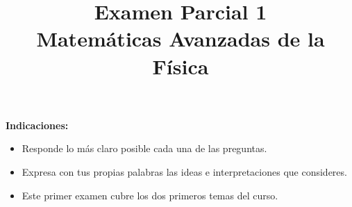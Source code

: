 
\usepackage{enumerate}
\usepackage{pifont}
\renewcommand{\labelitemi}{\ding{43}}
\title{{Examen Parcial 1} \\ {\large Matemáticas Avanzadas de la Física}}
\date{ }

\vspace{-4cm}
\renewcommand\labelenumii{\theenumi.{\arabic{enumii}}}
\maketitle
\fontsize{14}{14}\selectfont
\textbf{Indicaciones:}
\begin{itemize}
\item Responde lo más claro posible cada una de las preguntas.
\item Expresa con tus propias palabras las ideas e interpretaciones que consideres.
\item Este primer examen cubre los dos primeros temas del curso.
\end{itemize}
